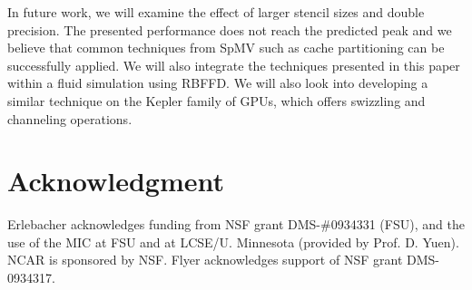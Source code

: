 \documentclass{sig-alternate}
\def\ge#1{{#1}}
\begin{document}
In future work, we will examine the effect of larger stencil sizes and
double precision. The presented performance does not reach the
predicted peak and we believe that common techniques from SpMV such as
cache partitioning can be successfully applied. We will also integrate
the techniques presented in this paper within a fluid simulation using
RBFFD. \ge{We will also look into developing a similar technique on the Kepler
family of GPUs, which offers swizzling and channeling operations.}

\section*{Acknowledgment}
Erlebacher acknowledges funding from NSF grant
DMS-\#0934331 (FSU), and the use of the MIC at FSU and at LCSE/U. Minnesota (provided by Prof. D. Yuen). NCAR is sponsored by NSF. 
Flyer acknowledges support of NSF grant DMS-0934317.



\end{document}
